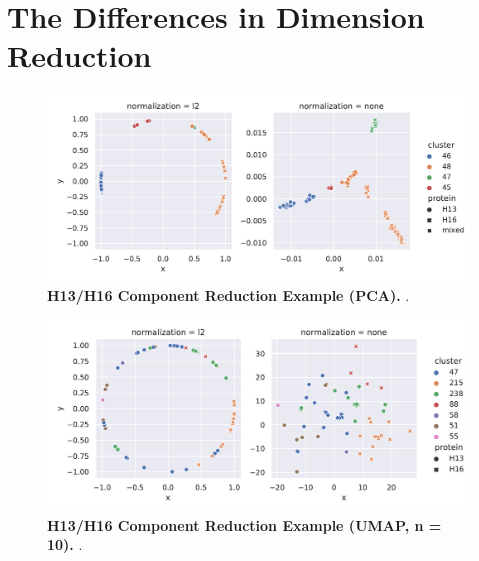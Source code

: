 \section{The Differences in Dimension Reduction} \label{sec:Dimension_Reduction}

\blindtext

\begin{figure}[!hbt]
    \centering
    \includegraphics[width=\textwidth]{PCA/Difference_Segment_4_H_PCA.pdf}
    \caption[H13/H16 Component Reduction Example (\Acrshort{PCA})]{\textbf{H13/H16 Component Reduction Example (\Acrshort{PCA}).} .}
    \label{fig:Reduction_Example_PCA}
\end{figure}

\begin{figure}[!hbt]
    \centering
    \includegraphics[width=\textwidth]{UMAP/Difference_Segment_4_H_UMAP_Neighbors_10.pdf}
    \caption[H13/H16 Component Reduction Example (\Acrshort{UMAP}, n = 10)]{\textbf{H13/H16 Component Reduction Example (\Acrshort{UMAP}, n = 10).} .}
    \label{fig:Reduction_Example_UMAP_10}
\end{figure}

